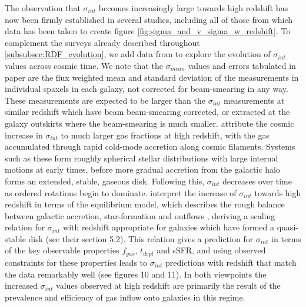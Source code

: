 \documentclass[fleqn,usenatbib]{mn2e}
\begin{document}
The observation that $\sigma_{int}$ becomes increasingly large towards high redshift has now been firmly established in several studies, including all of those from which data has been taken to create figure \ref{fig:sigma_and_v_sigma_w_redshift}.
To complement the surveys already described throughout \cref{subsubsec:RDF_evolution}, we add data from \cite{Law2009} to explore the evolution of $\sigma_{int}$ values across cosmic time.
We note that the $\sigma_{mean}$ values and errors tabulated in \cite{Law2009} paper are the flux weighted mean and standard deviation of the measurements in individual spaxels in each galaxy, not corrected for beam-smearing in any way.
These measurements are expected to be larger than the $\sigma_{int}$ measurements at similar redshift which have beam beam-smearing corrected, or extracted at the galaxy outskirts where the beam-smearing is much smaller.
\cite{Law2009} attribute the cosmic increase in $\sigma_{int}$ to much larger gas fractions at high redshift, with the gas accumulated through rapid cold-mode accretion along cosmic filaments.
Systems such as these form roughly spherical stellar distributions with large internal motions at early times, before more gradual accretion from the galactic halo forms an extended, stable, gaseous disk.
Following this, $\sigma_{int}$ decreases over time as ordered rotations begin to dominate.
\cite{Wisnioski2015} interpret the increase of $\sigma_{int}$ towards high redshift in terms of the equilibrium model, which describes the rough balance between galactic accretion, star-formation and outflows \citep[e.g.][]{Lilly2013}, deriving a scaling relation for $\sigma_{int}$ with redshift appropriate for galaxies which have formed a quasi-stable disk (see their section 5.2).
This relation gives a prediction for $\sigma_{int}$ in terms of the key observable properties $f_{gas}$, $t_{depl}$ and sSFR, and using observed constraints for these properties leads to $\sigma_{int}$ predictions with redshift that match the data remarkably well (see \cite{Wisnioski2015} figures 10 and 11).
In both viewpoints the increased $\sigma_{int}$ values observed at high redshift are primarily the result of the prevalence and efficiency of gas inflow onto galaxies in this regime. \\
\end{document}

